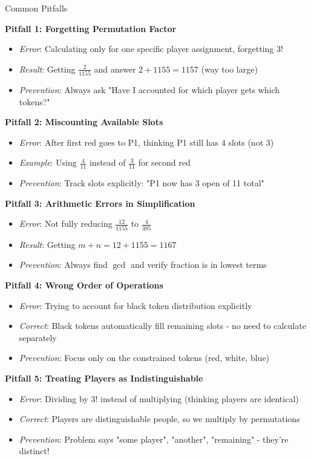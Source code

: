\documentclass[12pt]{article}
\begin{document}
\begin{warningbox}{Common Pitfalls}

\textbf{Pitfall 1: Forgetting Permutation Factor}
\begin{itemize}
    \item \textit{Error}: Calculating only for one specific player assignment, forgetting $3!$
    \item \textit{Result}: Getting $\frac{2}{1155}$ and answer $2 + 1155 = 1157$ (way too large)
    \item \textit{Prevention}: Always ask "Have I accounted for which player gets which tokens?"
\end{itemize}

\textbf{Pitfall 2: Miscounting Available Slots}
\begin{itemize}
    \item \textit{Error}: After first red goes to P1, thinking P1 still has 4 slots (not 3)
    \item \textit{Example}: Using $\frac{4}{11}$ instead of $\frac{3}{11}$ for second red
    \item \textit{Prevention}: Track slots explicitly: "P1 now has 3 open of 11 total"
\end{itemize}

\textbf{Pitfall 3: Arithmetic Errors in Simplification}
\begin{itemize}
    \item \textit{Error}: Not fully reducing $\frac{12}{1155}$ to $\frac{4}{385}$
    \item \textit{Result}: Getting $m + n = 12 + 1155 = 1167$
    \item \textit{Prevention}: Always find $\gcd$ and verify fraction is in lowest terms
\end{itemize}

\textbf{Pitfall 4: Wrong Order of Operations}
\begin{itemize}
    \item \textit{Error}: Trying to account for black token distribution explicitly
    \item \textit{Correct}: Black tokens automatically fill remaining slots - no need to calculate separately
    \item \textit{Prevention}: Focus only on the constrained tokens (red, white, blue)
\end{itemize}

\textbf{Pitfall 5: Treating Players as Indistinguishable}
\begin{itemize}
    \item \textit{Error}: Dividing by $3!$ instead of multiplying (thinking players are identical)
    \item \textit{Correct}: Players are distinguishable people, so we multiply by permutations
    \item \textit{Prevention}: Problem says "some player", "another", "remaining" - they're distinct!
\end{itemize}

\end{warningbox}
\end{document}
